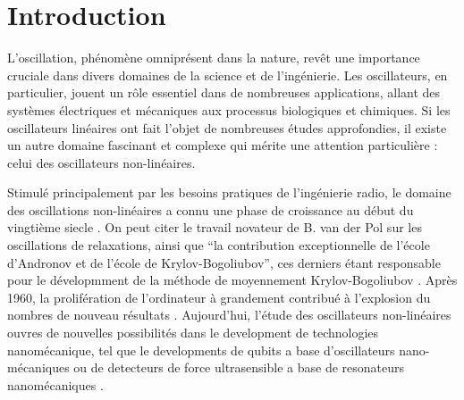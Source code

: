 \chapter{Introduction}
L'oscillation, phénomène omniprésent dans la nature, revêt une importance cruciale dans divers domaines de la science et de l'ingénierie. Les oscillateurs, en particulier, jouent un rôle essentiel dans de nombreuses applications, allant des systèmes électriques et mécaniques aux processus biologiques et chimiques. Si les oscillateurs linéaires ont fait l'objet de nombreuses études approfondies, il existe un autre domaine fascinant et complexe qui mérite une attention particulière : celui des oscillateurs non-linéaires.


Stimulé principalement par les besoins pratiques de l'ingénierie radio,
le domaine des oscillations non-linéaires a connu une phase de croissance au début du vingtième siecle \cite{samoilenko_nn_1994}.
On peut citer le travail novateur de B. van der Pol sur les oscillations de relaxations, 
ainsi que ``la contribution exceptionnelle de l'école d'Andronov et de l'école de Krylov-Bogoliubov'', 
ces derniers étant responsable pour le dévelopmment de la méthode de moyennement Krylov-Bogoliubov \cite{mira_historical_1997}.
Après 1960, la prolifération de l'ordinateur à grandement contribué à l'explosion du nombres de nouveau résultats \cite{mira_historical_1997}.
Aujourd'hui, l'étude des oscillateurs non-linéaires ouvres de nouvelles possibilités dans le development de technologies nanomécanique, 
tel que le developments de qubits a base d'oscillateurs nano-mécaniques \cite{} ou de detecteurs de force ultrasensible a base de resonateurs nanomécaniques \cite{}.


